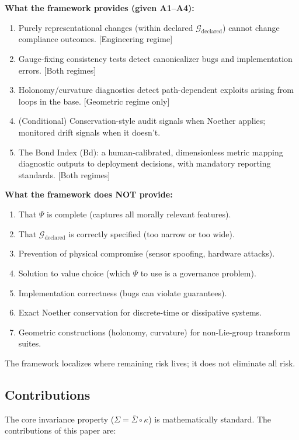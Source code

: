 \documentclass[12pt]{article}
\begin{document}
\textbf{What the framework provides (given A1--A4):}
\begin{enumerate}
\item Purely representational changes (within declared $\mathcal{G}_{\text{declared}}$) cannot change compliance outcomes. [Engineering regime]
\item Gauge-fixing consistency tests detect canonicalizer bugs and implementation errors. [Both regimes]
\item Holonomy/curvature diagnostics detect path-dependent exploits arising from loops in the
base. [Geometric regime only]
\item (Conditional) Conservation-style audit signals when Noether applies; monitored drift signals
when it doesn't.
\item The Bond Index (Bd): a human-calibrated, dimensionless metric mapping diagnostic outputs
to deployment decisions, with mandatory reporting standards. [Both regimes]
\end{enumerate}

\textbf{What the framework does NOT provide:}
\begin{enumerate}
\item That $\Psi$ is complete (captures all morally relevant features).
\item That $\mathcal{G}_{\text{declared}}$ is correctly specified (too narrow or too wide).
\item Prevention of physical compromise (sensor spoofing, hardware attacks).
\item Solution to value choice (which $\Psi$ to use is a governance problem).
\item Implementation correctness (bugs can violate guarantees).
\item Exact Noether conservation for discrete-time or dissipative systems.
\item Geometric constructions (holonomy, curvature) for non-Lie-group transform suites.
\end{enumerate}

The framework localizes where remaining risk lives; it does not eliminate all risk.

\subsection{Contributions}

The core invariance property ($\Sigma = \bar{\Sigma} \circ \kappa$) is mathematically standard. The contributions of this
paper are:
\end{document}
